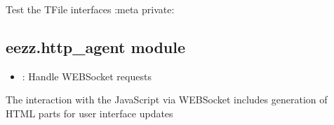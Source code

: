 \documentclass[letterpaper,10pt,english]{sphinxmanual}
\begin{document}
\begin{savenotes}
\begin{fulllineitems}

\begin{savenotes}\begin{fulllineitems}
\label{\detokenize{eezz:eezz.filesrv.TFileMode.DECRYPT}}
\pysigstartsignatures
{}
\pysigstopsignatures
\end{fulllineitems}\end{savenotes}


\end{fulllineitems}\end{savenotes}


\begin{savenotes}\begin{fulllineitems}
\label{\detokenize{eezz:eezz.filesrv.test_file_reader}}
\pysigstartsignatures
{}
\pysigstopsignatures
\sphinxAtStartPar
Test the TFile interfaces
:meta private:

\end{fulllineitems}\end{savenotes}



\subsection{eezz.http\_agent module}
\label{\detokenize{eezz:module-eezz.http_agent}}\label{\detokenize{eezz:eezz-http-agent-module}}\begin{itemize}
\item {} 
\sphinxAtStartPar
{}: Handle WEB\sphinxhyphen{}Socket requests

\end{itemize}

\sphinxAtStartPar
The interaction with the JavaScript via WEB\sphinxhyphen{}Socket includes generation of HTML parts for user interface updates
\end{document}
